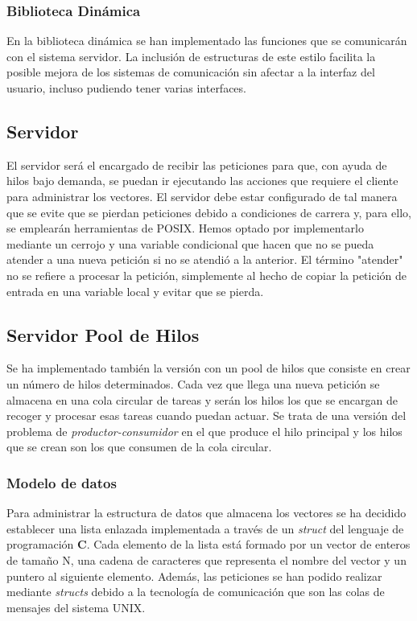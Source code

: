 \documentclass[10pt, spanish, pdftex]{template/UC3M_document}
\begin{document}
\subsubsection{Biblioteca Dinámica}
En la biblioteca dinámica se han implementado las funciones que se comunicarán con el sistema servidor. La inclusión de estructuras de este estilo facilita la posible mejora de los sistemas de comunicación sin afectar a la interfaz del usuario, incluso pudiendo tener varias interfaces.

\subsection{Servidor}
El servidor será el encargado de recibir las peticiones para que, con ayuda de hilos bajo demanda, se puedan ir ejecutando las acciones que requiere el cliente para administrar los vectores.
El servidor debe estar configurado de tal manera que se evite que se pierdan peticiones debido a condiciones de carrera y, para ello, se emplearán herramientas de POSIX. Hemos optado por implementarlo mediante un cerrojo y una variable condicional que hacen que no se pueda atender a una nueva petición si no se atendió a la anterior. El término "atender" no se refiere a procesar la petición, simplemente al hecho de copiar la petición de entrada en una variable local y evitar que se pierda.

\subsection{Servidor Pool de Hilos}
Se ha implementado también la versión con un pool de hilos que consiste en crear un número de hilos determinados. Cada vez que llega una nueva petición se almacena en una cola circular de tareas y serán los hilos los que se encargan de recoger y procesar esas tareas cuando puedan actuar. Se trata de una versión del problema de \textit{productor-consumidor} en el que produce el hilo principal y los hilos que se crean son los que consumen de la cola circular.


\subsubsection{Modelo de datos}
Para administrar la estructura de datos que almacena los vectores se ha decidido establecer una lista enlazada implementada a través de un \textit{struct} del lenguaje de programación \textbf{C}. Cada elemento de la lista está formado por un vector de enteros de tamaño N, una cadena de caracteres que representa el nombre del vector y un puntero al siguiente elemento.
Además, las peticiones se han podido realizar mediante \textit{structs} debido a la tecnología de comunicación que son las colas de mensajes del sistema UNIX.
\end{document}
